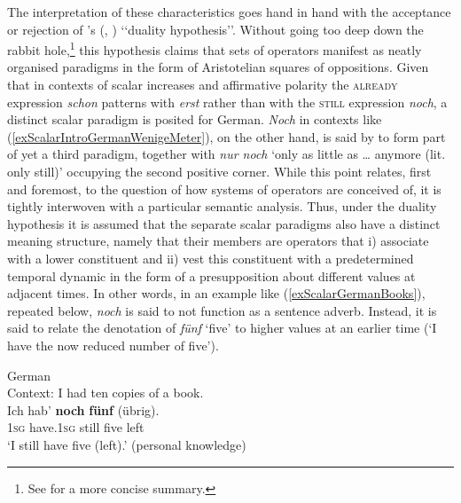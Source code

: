 The interpretation of these characteristics goes hand in hand with the acceptance or rejection of \citeauthor{Loebner1989}'s (\citeyear{Loebner1989}, \citeyear{Loebner1999}) \lq\lq duality hypothesis\rq\rq{}. Without going too deep down the rabbit hole,\footnote{See \textcite[ch 3.1.]{MosegaardHansen2008} for a more concise summary.} this hypothesis claims that sets of operators manifest as neatly organised paradigms in the form of Aristotelian squares of oppositions. Given that in contexts of scalar increases and affirmative polarity the \textsc{already} expression \textit{schon} patterns with  \textit{erst} rather than with the \textsc{still} expression \textit{noch}, a distinct scalar paradigm is posited for German. \textit{Noch} in contexts like (\ref{exScalarIntroGermanWenigeMeter}), on the other hand, is said by \textcite{Loebner1999} to form part of yet a third paradigm, together with \textit{nur noch} \lq only as little as … anymore (lit. only still)\rq{} occupying the second positive corner. While this point relates, first and foremost, to the question of how systems of operators are conceived of, it is tightly interwoven with a particular semantic analysis. Thus, under the duality hypothesis it is assumed that the separate scalar paradigms also have a distinct meaning structure, namely that their members are operators that i) associate with a lower constituent and ii) vest this constituent with a predetermined temporal dynamic in the form of a presupposition about different values at adjacent times. In other words, in an example like (\ref{exScalarGermanBooks}), repeated below, \textit{noch} is said to not function as a sentence adverb. Instead, it is said to relate the denotation of \textit{fünf} \lq five\rq{ }to higher values at an earlier time (\approx{}\lq I have the now reduced number of five\rq{}).
\pagebreak

\begin{exe}
	 German\\
	 Context: I had ten copies of a book.\\
	\gll Ich hab' \textbf{noch} \textbf{fünf} \textup{(}übrig\textup{)}. \\
	1\textsc{sg} have.1\textsc{sg} still five \phantom{(}left\\
	\glt \lq I still have five (left).' (personal knowledge)
\end{exe}


